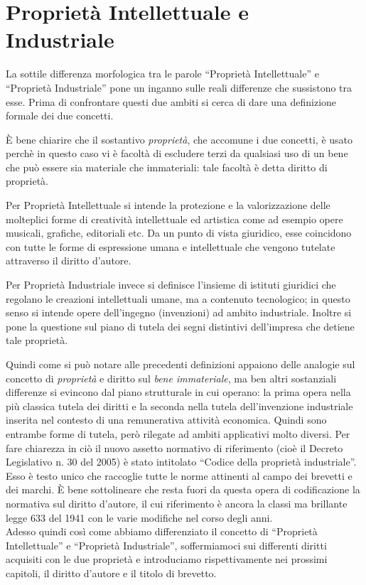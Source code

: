\chapter{Proprietà Intellettuale e Industriale}
La sottile differenza morfologica tra le parole ``Proprietà Intellettuale'' e ``Proprietà Industriale'' pone un inganno sulle reali differenze che sussistono tra esse. Prima di confrontare questi due ambiti si cerca di dare una definizione formale dei due concetti.

\`E bene chiarire che il sostantivo \textit{proprietà}, che accomune i due concetti, è usato perchè in questo caso vi è facoltà di escludere terzi da qualsiasi uso di un bene che può essere sia materiale che immateriali: tale facoltà è detta diritto di proprietà.

Per Proprietà Intellettuale si intende la protezione e la valorizzazione delle molteplici forme di creatività intellettuale ed artistica come ad esempio opere musicali, grafiche, editoriali etc. Da un punto di vista giuridico, esse coincidono con tutte le forme di espressione umana e intellettuale che vengono tutelate attraverso il diritto d'autore.

Per Proprietà Industriale invece si definisce l'insieme di istituti giuridici che regolano le creazioni intellettuali umane, ma a contenuto tecnologico; in questo senso si intende opere dell'ingegno (invenzioni) ad ambito industriale. Inoltre si pone la questione sul piano di tutela dei segni distintivi dell'impresa che detiene tale proprietà.

Quindi come si può notare alle precedenti definizioni appaiono delle analogie sul concetto di \textit{proprietà} e diritto sul \textit{bene immateriale}, ma ben altri sostanziali differenze si evincono dal piano strutturale in cui operano: la prima opera nella più classica tutela dei diritti e la seconda nella tutela dell'invenzione industriale inserita nel contesto di una remunerativa attività economica. Quindi sono entrambe forme di tutela, però rilegate ad ambiti applicativi molto diversi. Per fare chiarezza in ciò il nuovo assetto normativo di riferimento (cioè il Decreto Legislativo n. 30 del 2005) è stato intitolato “Codice della proprietà industriale”. Esso è testo unico che raccoglie tutte le norme attinenti al campo dei brevetti e dei marchi. \`E bene sottolineare che resta fuori da questa opera di codificazione la normativa sul diritto d'autore, il cui riferimento è ancora la classi ma brillante legge 633 del 1941 con le varie modifiche nel corso degli anni. \\
Adesso quindi così come abbiamo differenziato il concetto di ``Proprietà Intellettuale'' e ``Proprietà Industriale'', soffermiamoci sui differenti diritti acquisiti con le due proprietà e introduciamo rispettivamente nei prossimi capitoli, il diritto d'autore e il titolo di brevetto.

